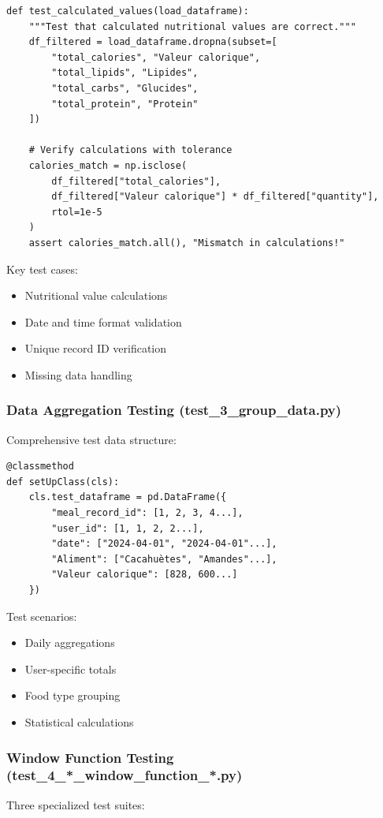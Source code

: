 \begin{lstlisting}[style=pythonstyle, caption=Nutritional Calculation Tests]
def test_calculated_values(load_dataframe):
    """Test that calculated nutritional values are correct."""
    df_filtered = load_dataframe.dropna(subset=[
        "total_calories", "Valeur calorique",
        "total_lipids", "Lipides",
        "total_carbs", "Glucides",
        "total_protein", "Protein"
    ])
    
    # Verify calculations with tolerance
    calories_match = np.isclose(
        df_filtered["total_calories"],
        df_filtered["Valeur calorique"] * df_filtered["quantity"],
        rtol=1e-5
    )
    assert calories_match.all(), "Mismatch in calculations!"
\end{lstlisting}

Key test cases:
\begin{itemize}
    \item Nutritional value calculations
    \item Date and time format validation
    \item Unique record ID verification
    \item Missing data handling
\end{itemize}

\subsubsection{Data Aggregation Testing (test\_3\_group\_data.py)}
Comprehensive test data structure:

\begin{lstlisting}[style=pythonstyle, caption=Test Data Setup]
@classmethod
def setUpClass(cls):
    cls.test_dataframe = pd.DataFrame({
        "meal_record_id": [1, 2, 3, 4...],
        "user_id": [1, 1, 2, 2...],
        "date": ["2024-04-01", "2024-04-01"...],
        "Aliment": ["Cacahuètes", "Amandes"...],
        "Valeur calorique": [828, 600...]
    })
\end{lstlisting}

Test scenarios:
\begin{itemize}
    \item Daily aggregations
    \item User-specific totals
    \item Food type grouping
    \item Statistical calculations
\end{itemize}

\subsubsection{Window Function Testing (test\_4\_*\_window\_function\_*.py)}
Three specialized test suites:

